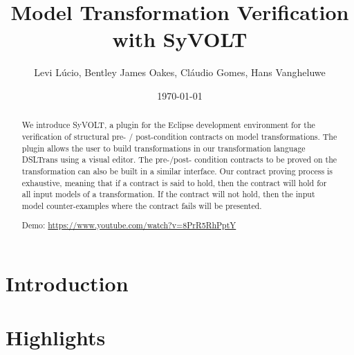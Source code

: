 \documentclass[conference]{IEEEtran}
\begin{document}
\title{Model Transformation Verification with SyVOLT}
\author{Levi L\'{u}cio, Bentley James Oakes, Cl\'{a}udio Gomes, Hans Vangheluwe}

\author{
	}

\date{\today}


\maketitle 




\begin{abstract}
 
We introduce SyVOLT, a plugin for the Eclipse development environment for the
verification of structural pre- / post-condition contracts on model
transformations. The plugin allows the user to build transformations in our
transformation language DSLTrans using a visual editor. The pre-/post- condition
contracts to be proved on the transformation can also be built in a similar
interface. Our contract proving process is exhaustive, meaning that if a
contract is said to hold, then the contract will hold for all input models of a
transformation. If the contract will not hold, then the input model
counter-examples where the contract fails will be presented.

Demo: \url{https://www.youtube.com/watch?v=8PrR5RhPptY}



\end{abstract}


\section{Introduction}
\label{sec:intro}


\section{Highlights}
\label{sec:highlights}

\end{document}
